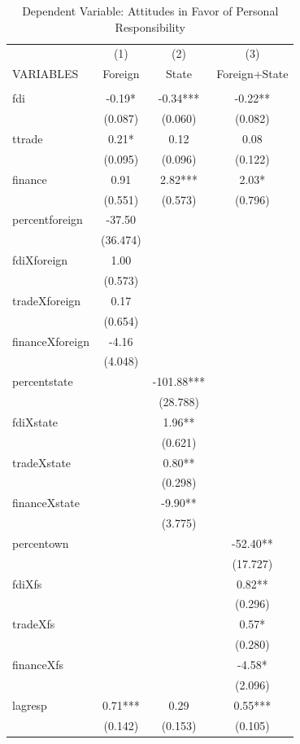 \documentclass[12pt]{report}
\begin{document}
\begin{table}[htdp]
\caption{Dependent Variable: Attitudes in Favor of Personal Responsibility}
\begin{center}
{\footnotesize
\begin{tabular}{lccc} \hline  & (1) & (2) & (3) \\ VARIABLES &
Foreign & State & Foreign+State \\ \hline  &  &
 &  \\ fdi & -0.19* &
-0.34*** & -0.22** \\  & (0.087) &
(0.060) & (0.082) \\
ttrade & 0.21* & 0.12 & 0.08 \\  & (0.095) &
(0.096) & (0.122) \\
finance & 0.91 & 2.82*** & 2.03* \\  & (0.551) &
(0.573) & (0.796) \\
percentforeign & -37.50 &  &  \\  & (36.474) &
 &  \\ fdiXforeign &
1.00 &  &  \\  & (0.573) &
 &  \\ tradeXforeign &
0.17 &  &  \\  & (0.654) &
 &  \\ financeXforeign &
-4.16 &  &  \\  & (4.048) &
 &  \\ percentstate &  &
-101.88*** &  \\  &  &
(28.788) &  \\ fdiXstate
&  & 1.96** &  \\  &  &
(0.621) &  \\
tradeXstate &  & 0.80** &  \\  &  &
(0.298) &  \\
financeXstate &  & -9.90** &  \\  &  &
(3.775) &  \\ percentown
&  &  & -52.40** \\  &  &
 & (17.727) \\ fdiXfs &
&  & 0.82** \\  &  &
 & (0.296) \\ tradeXfs &
&  & 0.57* \\  &  &
 & (0.280) \\ financeXfs
&  &  & -4.58* \\  &  &
 & (2.096) \\ lagresp &
0.71*** & 0.29 & 0.55*** \\  & (0.142) &
(0.153) & (0.105) \\

\end{tabular}}
\end{center}
\end{table}
\end{document}
